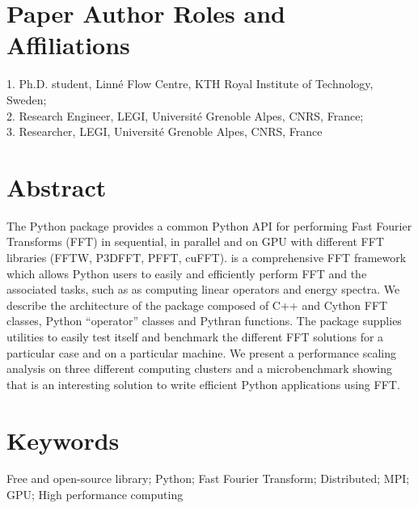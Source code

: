 \documentclass{../jors}
\begin{document}
\section*{Paper Author Roles and Affiliations}

1. Ph.D. student, Linn\'e Flow Centre, KTH Royal Institute of Technology,
Sweden; \\
2. Research Engineer, LEGI, Universit\'e Grenoble Alpes, CNRS, France; \\
3. Researcher, LEGI, Universit\'e Grenoble Alpes, CNRS, France

\section*{Abstract}


The Python package  provides a common Python API for performing
Fast Fourier Transforms (FFT) in sequential, in parallel and on GPU with different
FFT libraries (FFTW, P3DFFT, PFFT, cuFFT).  is a comprehensive FFT
framework which allows Python users to easily and efficiently perform FFT and the
associated tasks, such as as computing linear operators and energy spectra.
%
We describe the architecture of the package composed of C++ and Cython FFT
classes, Python ``operator'' classes and Pythran functions.
%
The package supplies utilities to easily test itself and benchmark the different
FFT solutions for a particular case and on a particular machine.
%
We present a performance scaling analysis on three different computing clusters
and a microbenchmark showing that  is an interesting solution to
write efficient Python applications using FFT.

\section*{Keywords}


Free and open-source library; Python; Fast Fourier Transform; Distributed; MPI;
GPU; High performance computing%
\end{document}
